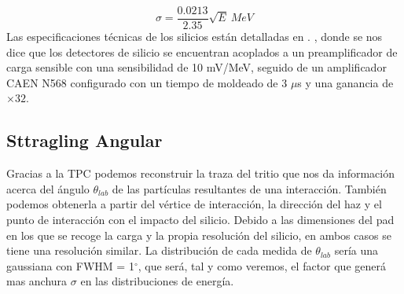 \begin{equation}
	\sigma = \frac{0.0213}{2.35} \sqrt{E} \ \unit{MeV} \label{Ec:03-resolucion}
\end{equation}
Las especificaciones técnicas de los silicios están detalladas en   \cite{MAUSS2019498}. , donde se nos dice que los detectores de silicio se encuentran acoplados a un preamplificador de carga sensible con una sensibilidad de 10 mV/MeV, seguido de un amplificador CAEN N568 configurado con un tiempo de moldeado de 3 $\mu$s y una ganancia de $\times 32$.

\subsection{Sttragling Angular}

Gracias a la TPC podemos reconstruir la traza del tritio que nos da información acerca del ángulo $\theta_{lab}$ de las partículas resultantes de una interacción. También podemos obtenerla  a partir del vértice de interacción, la dirección del haz y el punto de interacción con el impacto del silicio. Debido a las dimensiones del pad en los que se recoge la carga y la propia resolución del silicio, en ambos casos se tiene una resolución similar. La distribución de cada medida de $\theta_{lab}$ sería una gaussiana con FWHM = 1$^{\circ}$, que será, tal y como veremos, el factor que generá mas anchura $\sigma$ en las distribuciones de energía.